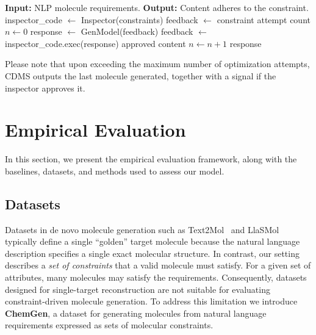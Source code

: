 \documentclass[10pt]{article} %
\begin{document}
    \begin{algorithm}
        \caption{CDMS algorithm}
        \label{alg:generation_process}
        \begin{algorithmic}[1]
            \STATE \textbf{Input:} NLP molecule requirements.
            \STATE \textbf{Output:} Content adheres to the constraint.
            \STATE
            \STATE inspector\_code $\leftarrow$ Inspector(constraints)
            \STATE feedback $\leftarrow$ constraint
            \STATE attempt count $n \leftarrow 0$
            \STATE response $\leftarrow$ GenModel(feedback)
            \STATE feedback $\leftarrow$ inspector\_code.exec(response)
            \RETURN approved content
            \ENDIF
            \STATE $n \leftarrow n + 1$
            \ENDWHILE
            \RETURN response
        \end{algorithmic}
    \end{algorithm}

    Please note that upon exceeding the maximum number of optimization attempts, CDMS outputs the last molecule generated, together with a signal if the inspector approves it.

    
\section{Empirical Evaluation}
    In this section, we present the empirical evaluation framework, along with the baselines, datasets, and methods used to assess our model.

    \subsection{Datasets}
    \label{sec:dataset}

Datasets in de novo molecule generation such as Text2Mol~\cite{edwards2021text2mol} and LlaSMol~\cite{yu2024llasmol} typically define a single ``golden'' target molecule because the natural language description specifies a single exact molecular structure. In contrast, our setting describes a \emph{set of constraints} that a valid molecule must satisfy. For a given set of attributes, many molecules may satisfy the requirements. Consequently, datasets designed for single-target reconstruction are not suitable for evaluating constraint-driven molecule generation. To address this limitation we introduce \textbf{ChemGen}, a dataset for generating molecules from natural language requirements expressed as sets of molecular constraints.
\end{document}
